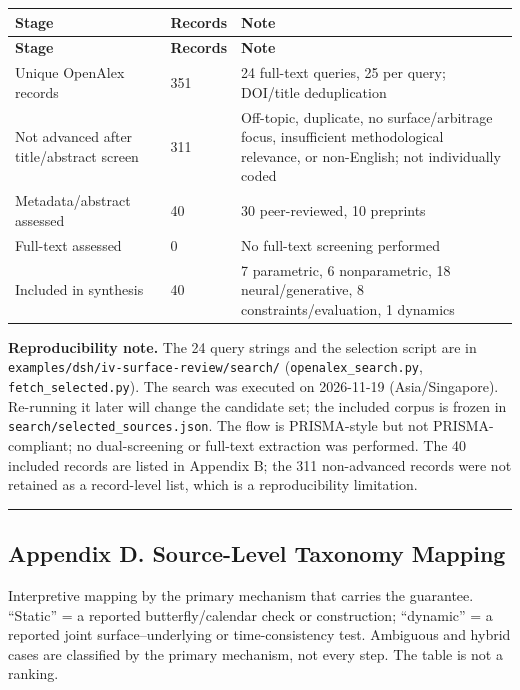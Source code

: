 \documentclass[11pt]{article}
\begin{document}
\begingroup
\begin{longtable}{@{}p{}p{}p{}@{}}
\toprule
\textbf{Stage} & \textbf{Records} & \textbf{Note} \\
\midrule
\endfirsthead
\toprule
\textbf{Stage} & \textbf{Records} & \textbf{Note} \\
\midrule
\endhead
Unique OpenAlex records & 351 & 24 full-text queries, 25 per query; DOI/title deduplication \\
Not advanced after title/abstract screen & 311 & Off-topic, duplicate, no surface/arbitrage focus, insufficient methodological relevance, or non-English; not individually coded \\
Metadata/abstract assessed & 40 & 30 peer-reviewed, 10 preprints \\
Full-text assessed & 0 & No full-text screening performed \\
Included in synthesis & 40 & 7 parametric, 6 nonparametric, 18 neural/generative, 8 constraints/evaluation, 1 dynamics \\
\bottomrule
\end{longtable}
\endgroup

\textbf{Reproducibility note.} The 24 query strings and the selection script are in \texttt{examples/dsh/iv-surface-review/search/} (\texttt{openalex\_search.py}, \texttt{fetch\_selected.py}). The search was executed on 2026-11-19 (Asia/Singapore). Re-running it later will change the candidate set; the included corpus is frozen in \texttt{search/selected\_sources.json}. The flow is PRISMA-style but not PRISMA-compliant; no dual-screening or full-text extraction was performed. The 40 included records are listed in Appendix B; the 311 non-advanced records were not retained as a record-level list, which is a reproducibility limitation.

\par\medskip\hrule\medskip
\subsection*{Appendix D. Source-Level Taxonomy Mapping}
Interpretive mapping by the primary mechanism that carries the guarantee. “Static” = a reported butterfly/calendar check or construction; “dynamic” = a reported joint surface–underlying or time-consistency test. Ambiguous and hybrid cases are classified by the primary mechanism, not every step. The table is not a ranking.
\end{document}
